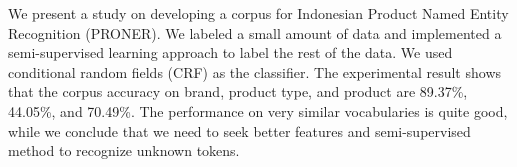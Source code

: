 We present a study on developing a corpus for Indonesian Product Named Entity Recognition (PRONER). We labeled a small amount of data and implemented a semi-supervised learning approach to label the rest of the data. We used conditional random fields (CRF) as the classifier. The experimental result shows that the corpus accuracy on brand, product type, and product are 89.37\%, 44.05\%, and 70.49\%. The performance on very similar vocabularies is quite good, while we conclude that we need to seek better features and semi-supervised method to recognize unknown tokens.
